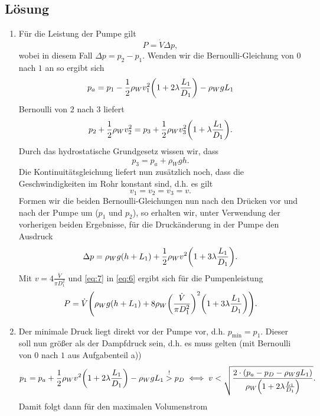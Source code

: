 \documentclass{exercise}
\begin{document}
    \subsection*{Lösung}
    \begin{enumerate}
        \item Für die Leistung der Pumpe gilt
        \begin{equation}\label{eq:6}
            P = \dot{V}\Delta p,
        \end{equation}
        wobei in diesem Fall \(\Delta p = p_2 - p_1\).
        Wenden wir die Bernoulli-Gleichung von \(0\) nach \(1\) an so ergibt sich
        \[
            p_a = p_1 - \frac{1}{2}\rho_W v_1^2\parentheses*{1 + 2\lambda\frac{L_1}{D_1}} - \rho_W gL_1
        \]
        Bernoulli von \(2\) nach \(3\) liefert
        \[
            p_2 + \frac{1}{2}\rho_W v_2^2 = p_3 + \frac{1}{2}\rho_W v_3^2\parentheses*{1 + \lambda\frac{L_1}{D_1}}.
        \]
        Durch das hydrostatische Grundgesetz wissen wir, dass
        \[
            p_3 = p_a + \rho_W gh.
        \]
        Die Kontinuitätsgleichung liefert nun zusätzlich noch, dass die Geschwindigkeiten im Rohr konstant sind, d.h. es gilt
        \[
            v_1 = v_2 = v_3 = v.
        \]
        Formen wir die beiden Bernoulli-Gleichungen nun nach den Drücken vor und nach der Pumpe um (\(p_1\) und \(p_2\)), so erhalten wir, unter Verwendung der vorherigen beiden Ergebnisse, für die Druckänderung in der Pumpe den Ausdruck
        \begin{equation}\label{eq:7}
            \Delta p = \rho_W g\parentheses*{h + L_1} + \frac{1}{2}\rho_W v^2\parentheses*{1 + 3\lambda\frac{L_1}{D_1}}.
        \end{equation}
        Mit \(v = 4\frac{\dot{V}}{\pi D_1^2}\) und \eqref{eq:7} in \eqref{eq:6} ergibt sich für die Pumpenleistung
        \[
            P = \dot{V}\parentheses*{\rho_W g\parentheses*{h + L_1} + 8\rho_W \parentheses*{\frac{\dot{V}}{\pi D_1^2}}^2 \parentheses*{1 + 3\lambda\frac{L_1}{D_1}}}.
        \]
        \item Der minimale Druck liegt direkt vor der Pumpe vor, d.h. \(p_{\text{min}} = p_1\).
        Dieser soll nun größer als der Dampfdruck sein, d.h. es muss gelten (mit Bernoulli von \(0\) nach \(1\) aus Aufgabenteil a))
        \[
            p_1 = p_a + \frac{1}{2}\rho_W v^2\parentheses*{1 + 2\lambda\frac{L_1}{D_1}} - \rho_W gL_1 \stackrel{!}{>} p_D \iff v < \sqrt{\frac{2 \cdot \parentheses*{p_a - p_D - \rho_W gL_1}}{\rho_W \parentheses*{1 + 2\lambda\frac{L_1}{D_1}}}}.
        \]
        Damit folgt dann für den maximalen Volumenstrom

\end{enumerate}
\end{document}
